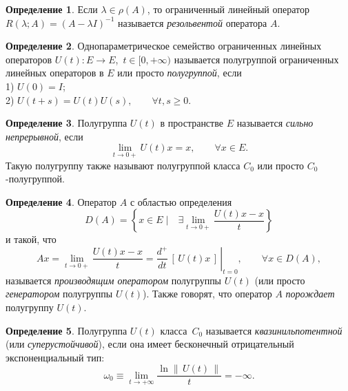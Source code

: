 \documentclass{article}
\renewcommand{\ge}{\geqslant}
\theoremstyle{definition}
\newtheorem{definition}{Определение}
\begin{document}
\begin{definition} \label{resolvent}
	Если $\lambda \in \rho(A)$, то ограниченный линейный оператор \linebreak $R(\lambda; A) = (A - \lambda I)^{-1}$ называется 
	\textit{резольвентой} оператора $A$.
\end{definition}

\begin{definition} \label{semigroup}
	Однопараметрическое семейство ограниченных линейных операторов $ U(t): E \rightarrow E $, $\, t \in [0, +\infty) $ 
	называется полугруппой ограниченных линейных операторов в $E$ или просто \textit{полугруппой}, если \\
	1) $ U(0) = I $; \\
	2) $ U(t + s) = U(t)U(s), \qquad \forall t, s \ge 0 $.
\end{definition}

\begin{definition} \label{strongly continious semigroup}
	Полугруппа $ U(t)$ в пространстве $ E $ называется \textit{сильно непрерывной}, если 
	\begin{equation*}
		\lim\limits_{t \rightarrow 0+} U(t)x = x, \qquad \forall x \in E.
	\end{equation*}
	Такую полугруппу также называют полугруппой класса $ C_0 $ или просто \linebreak $ C_0\, $-полугруппой.
\end{definition}

\begin{definition} \label{generator}
	Оператор $A$ с областью определения
	\begin{equation*}
		D(A) = \left\{ x \in E \; \bigg| \quad \exists \lim\limits_{t \rightarrow 0+} \frac{U(t)x - x}{t} \right\} 
	\end{equation*}
	и такой, что
	\begin{equation*}
		Ax = \lim\limits_{t \rightarrow 0+} \frac{U(t)x - x}{t} = \left. \frac{d^+}{dt}\,[\, U(t) x \,] \,\right|_{t = 0}, 
		\qquad \forall x \in D(A),
	\end{equation*}
	называется \textit{производящим оператором} полугруппы $U(t)$ (или просто \textit{генератором} полугруппы $U(t)$).
	Также говорят, что оператор $ A $ \textit{порождает} полугруппу $U(t)$.
\end{definition}

\begin{definition} \label{quasi-nilpotent semigroup}
	Полугруппа $U(t)$ класса~$C_0$ называется \textit{квазинильпотентной} (или \textit{суперустойчивой}), 
	если она имеет бесконечный отрицательный экспоненциальный тип:
	\begin{equation*}
		\omega_0 \equiv \lim\limits_{t \rightarrow +\infty} \frac{\ln \|\, U(t) \, \|}{t} = -\infty.
	\end{equation*}
\end{definition}
\end{document}
